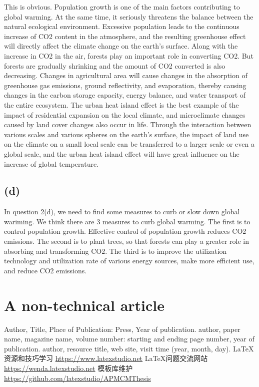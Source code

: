 \documentclass{apmcmthesis}
\begin{document}
This is obvious. 
Population growth is one of the main factors contributing to global warming. 
At the same time, it seriously threatens the balance between the natural ecological environment. 
Excessive population leads to the continuous increase of CO2 content in the atmosphere, and the resulting greenhouse effect will directly affect the climate change on the earth's surface. 
Along with the increase in CO2 in the air, forests play an important role in converting CO2. 
But forests are gradually shrinking and the amount of CO2 converted is also decreasing. 
Changes in agricultural area will cause changes in the absorption of greenhouse gas emissions, ground reflectivity, and evaporation, 
thereby causing changes in the carbon storage capacity, energy balance, and water transport of the entire ecosystem. 
The urban heat island effect is the best example of the impact of residential expansion on the local climate, and microclimate changes caused by land cover changes also occur in life. 
Through the interaction between various scales and various spheres on the earth's surface, the impact of land use on the climate on a small local scale can be transferred to a larger scale or even a global scale, 
and the urban heat island effect will have great influence on the increase of global temperature.

\subsection{(d)}
In question 2(d), we need to find some measures to curb or slow down global wariming.
We think there are 3 measures to curb global warming. The first is to control population growth. 
Effective control of population growth reduces CO2 emissions. The second is to plant trees, so that forests can play a greater role in absorbing and transforming CO2. 
The third is to improve the utilization technology and utilization rate of various energy sources, make more efficient use, and reduce CO2 emissions.



\newpage
\section{A non-technical article}

\begin{thebibliography}{9}%
 Author, Title, Place of Publication: Press, Year of publication.
 author, paper name, magazine name, volume number: starting and ending
page number, year of publication.
 author, resource title, web site, visit time (year, month, day).
 \LaTeX{}{资源和技巧学习} \url{https://www.latexstudio.net}
 \LaTeX{}{问题交流网站} \url{https://wenda.latexstudio.net}
 {模板库维护} \url{https://github.com/latexstudio/APMCMThesis}
\end{thebibliography}
\end{document}
